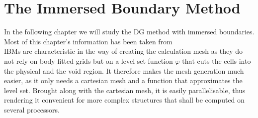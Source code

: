 \chapter{The Immersed Boundary Method}
\label{immersedBoundaries}
In the following chapter we will study the DG method with immersed boundaries. Most of this chapter's information has been taken from \cite{paper} \\ \indent 
IBMs are characteristic in the way of creating the calculation mesh as they do not rely on body fitted grids but on a level set function $\varphi$ that cuts the cells into the physical and the void region. It therefore makes the mesh generation much easier, as it only needs a cartesian mesh and a function that approximates the level set. Brought along with the cartesian mesh, it is easily parallelisable, thus rendering it convenient for more complex structures that shall be computed on several processors.
